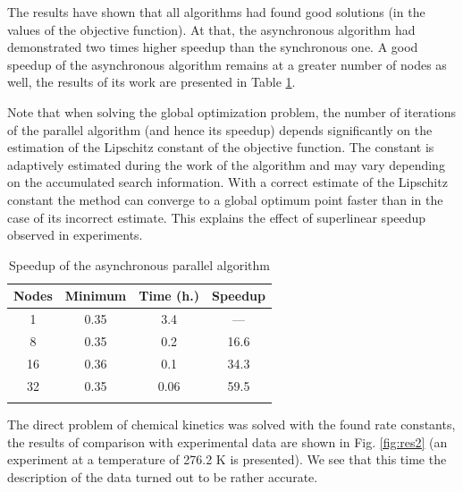 \documentclass{svproc}
\begin{document}
The results have shown that all algorithms had found good solutions (in the values of the objective function). At that, the asynchronous algorithm had demonstrated two times higher speedup than the synchronous one. A good speedup of the asynchronous algorithm remains at a greater number of nodes as well, the results of its work are presented in Table \ref{tab_parall}.

Note that when solving the global optimization problem, the number of iterations of the parallel algorithm (and hence its speedup) depends significantly on the estimation of the Lipschitz constant of the objective function. The constant is adaptively estimated during the work of the algorithm and may vary depending on the accumulated search information. With a correct estimate of the Lipschitz constant the method can converge to a global optimum point faster than in the case of its incorrect estimate. This explains the effect of superlinear speedup observed in experiments.

\begin{table}
\caption{Speedup of the asynchronous parallel algorithm}
\label{tab_parall}
\begin{center}
\begin{tabular}{cccc}
\hline\noalign{\smallskip}
Nodes  & Minimum  & Time (h.) & Speedup \\
\hline\noalign{\smallskip}
1  & 0.35   &   3.4     &   ---        \\
8  & 0.35   &   0.2     &   16.6       \\
16 & 0.36   &   0.1     &   34.3       \\
32 & 0.35   &   0.06    &   59.5       \\
\noalign{\smallskip}\hline
\end{tabular}\end{center}\end{table}

The direct problem of chemical kinetics was solved with the found rate constants, the results of comparison with experimental data are shown in Fig. \ref{fig:res2} (an experiment at a temperature of 276.2 K is presented). We see that this time the description of the data turned out to be rather accurate.
\end{document}
